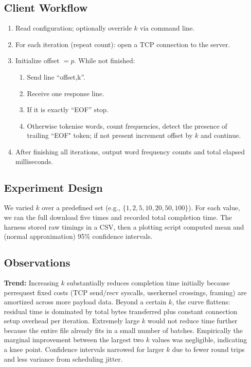 \documentclass[11pt,a4paper]{article}
\begin{document}
\subsection{Client Workflow}
\begin{enumerate}[leftmargin=1.2cm]
  \item Read configuration; optionally override $k$ via command line.
  \item For each iteration (repeat count): open a TCP connection to the server.
  \item Initialize offset $= p$. While not finished:
    \begin{enumerate}
      \item Send line ``offset,k''. \item Receive one response line. \item If it is exactly ``EOF'' stop. \item Otherwise tokenise words, count frequencies, detect the presence of trailing ``EOF" token; if not present increment offset by $k$ and continue.
    \end{enumerate}
  \item After finishing all iterations, output word frequency counts and total elapsed milliseconds.
\end{enumerate}

\subsection{Experiment Design}
We varied $k$ over a predefined set (e.g., $\{1,2,5,10,20,50,100\}$). For each value, we ran the full download five times and recorded total completion time. The harness stored raw timings in a CSV, then a plotting script computed mean and (normal approximation) 95\% confidence intervals.

\subsection{Observations}
\textbf{Trend:} Increasing $k$ substantially reduces completion time initially because per\-request fixed costs (TCP send/recv syscalls, user\-kernel crossings, framing) are amortized across more payload data. Beyond a certain $k$, the curve flattens: residual time is dominated by total bytes transferred plus constant connection setup overhead per iteration. Extremely large $k$ would not reduce time further because the entire file already fits in a small number of batches. Empirically the marginal improvement between the largest two $k$ values was negligible, indicating a knee point. Confidence intervals narrowed for larger $k$ due to fewer round trips and less variance from scheduling jitter.
\end{document}
